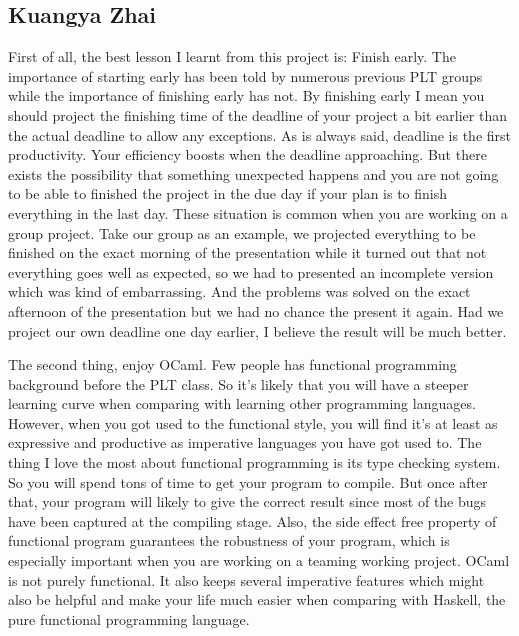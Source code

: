 \subsection{Kuangya Zhai}
First of all, the best lesson I learnt from this project is: Finish early. The importance of starting early has been told by numerous previous PLT groups while the importance of finishing early has not. By finishing early I mean you should project the finishing time of the deadline of your project a bit earlier than the actual deadline to allow any exceptions. As is always said, deadline is the first productivity. Your efficiency boosts when the deadline approaching. But there exists the possibility that something unexpected happens and you are not going to be able to finished the project in the due day if your plan is to finish everything in the last day. These situation is common when you are working on a group project. Take our group as an example, we projected everything to be finished on the exact morning of the presentation while it turned out that not everything goes well as expected, so we had to presented an incomplete version which was kind of embarrassing. And the problems was solved on the exact afternoon of the presentation but we had no chance the present it again. Had we project our own deadline one day earlier, I believe the result will be much better. 

The second thing, enjoy OCaml. Few people has functional programming background before the PLT class. So it's likely that you will have a steeper learning curve when comparing with learning other programming languages. However, when you got used to the functional style, you will find it's at least as expressive and productive as imperative languages you have got used to. The thing I love the most about functional programming is its type checking system. So you will spend tons of time to get your program to compile. But once after that, your program will likely to give the correct result since most of the bugs have been captured at the compiling stage. Also, the side effect free property of functional program guarantees the robustness of your program, which is especially important when you are working on a teaming working project. OCaml is not purely functional. It also keeps several imperative features which might also be helpful and make your life much easier when comparing with Haskell, the pure functional programming language. 
